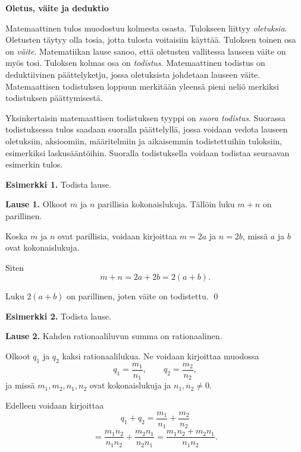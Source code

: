 
{\bf Oletus, väite ja deduktio}

Matemaattinen tulos muodostuu kolmesta osasta. Tulokseen liittyy {\em oletuksia}. Oletusten täytyy olla tosia, jotta tulosta voitaisiin käyttää. Tuloksen toinen osa on {\em väite}. Matematiikan lause sanoo, että oletusten vallitessa lauseen väite on myös tosi. Tuloksen kolmas osa on {\em todistus}. Matemaattinen todistus on deduktiivinen päättelyketju, jossa oletuksista johdetaan lauseen väite. Matemaattisen todistuksen loppuun merkitään yleensä pieni neliö merkiksi todistuksen päättymisestä.

Yksinkertaisin matemaattisen todistuksen tyyppi on {\em suora todistus}. Suorassa todistuksessa tulos saadaan suoralla päättelyllä, jossa voidaan vedota lauseen oletuksiin, aksioomiin, määritelmiin ja aikaisemmin todistettuihin tuloksiin, esimerkiksi laskusääntöihin. Suoralla todistuksella voidaan todistaa seuraavan esimerkin tulos.

{\bf Esimerkki 1.} Todista lause.

{\bf Lause 1.} Olkoot $m$ ja $n$ parillisia kokonaislukuja. Tällöin luku $m+n$ on parillinen.

\proof
Koska $m$ ja $n$ ovat parillisia, voidaan kirjoittaa $m=2a$ ja $n=2b$, missä $a$ ja $b$ ovat kokonaislukuja.

Siten
\[
m+n =2a+2b = 2(a+b).
\]

Luku $2(a+b)$ on parillinen, joten väite on todistettu.
\qed

{\bf Esimerkki 2.} Todista lause.

{\bf Lause 2.} Kahden rationaaliluvun summa on rationaalinen.

\proof
Olkoot $q_1$ ja $q_2$ kaksi rationaalilukua. Ne voidaan kirjoittaa muodossa
\[
q_1=\frac{m_1}{n_1},\qquad 
q_2=\frac{m_2}{n_2},
\]
ja missä $m_1,m_2,n_1,n_2$ ovat kokonaislukuja ja $n_1,n_2\neq 0$.

Edelleen voidaan kirjoittaa
\[
q_1+q_2 = \frac{m_1}{n_1}+ \frac{m_2}{n_2}
\]
\[
= \frac{m_1 n_2}{n_1 n_2}+ \frac{m_2 n_1}{n_2 n_1} = \frac{m_1n_2 + m_2 n_1}{n_1 n_2}.
\]

